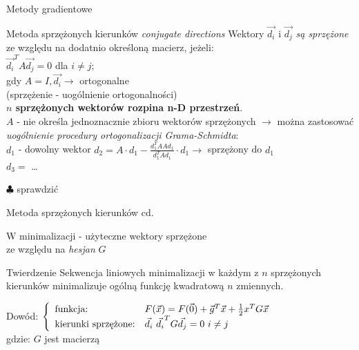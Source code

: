   \begin{frame}{Metody gradientowe}

 	\begin{block}{Metoda sprzężonych kierunków \emph{conjugate directions}}
 	   Wektory $\vec{d_i}$ i $\vec{d_j}$ \emph{są sprzężone} ze względu na dodatnio określoną macierz, jeżeli:
 	   \\$\vec{d_i}^T A\vec{d_j} = 0$ dla $i \neq j$;
 	   \\gdy $A = I, \vec{d_i} \rightarrow$ ortogonalne
 	   \\(sprzężenie - uogólnienie ortogonalności)
 	   \\ \textbf{$n$ sprzężonych wektorów rozpina n-D przestrzeń}.
 	   \\$A$ - nie określa jednoznacznie zbioru wektorów sprzężonych $\rightarrow$ można zastosować
 	   \emph{uogólnienie procedury ortogonalizacji Grama-Schmidta}:
 	   \\$d_1$ - dowolny wektor $d_2 = A \cdot d_1 - \frac{d_1^T A A d_1}{d_1^T A d_1} \cdot d_1 \rightarrow$ sprzężony do $d_1$
 	   \\$d_3 =$ \ldots
 	   \begin{flushright}
 	      $\clubsuit$ sprawdzić
 	   \end{flushright}
 	\end{block}

  \end{frame}

  \begin{frame}{Metoda sprzężonych kierunków cd.}

    W minimalizacji - użyteczne wektory sprzężone
    \\ze względu na \emph{hesjan} $G$
 	\begin{block}{Twierdzenie}
 	   Sekwencja liniowych minimalizacji w każdym z $n$ sprzężonych kierunków minimalizuje ogólną funkcję kwadratową $n$ zmiennych.
 	\end{block}
 	\begin{block}{Dowód:}
 	   $\left\{
        \begin{array}{l l}
          \text{funkcja:} & F(\vec{x}) = F(\vec{0}) + \vec{g}^T \vec{x} + \frac{1}{2} x^T G \vec{x} \\
          \text{kierunki sprzężone:} & \vec{d_i} \ \vec{d_i}^T G \vec{d_j} = 0 \ i \neq j
	    \end{array}
	  \right.$
	  \\gdzie: $G$ jest macierzą
 	\end{block}

  \end{frame}

